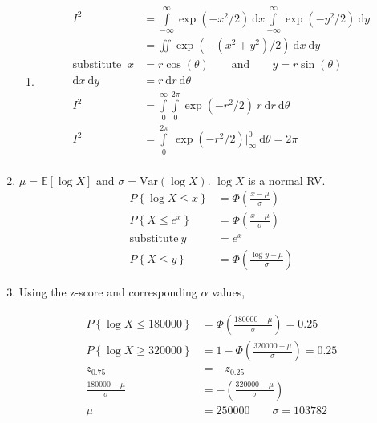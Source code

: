 \begin{enumerate}
\begin{enumerate}
			\item \begin{align}
				I^2 &= \int\limits_{-\infty}^{\infty} \exp(-x^2/2) \ \mathrm{d}x \int\limits_{-\infty}^{\infty} \exp(-y^2/2) \ \mathrm{d}y \nonumber \\
				&= \iint \exp(-(x^2+y^2)/2) \ \mathrm{d}x \ \mathrm{d}y \nonumber \\
				\text{substitute }\ x &= r\cos(\theta) \qquad \text{and} \qquad y = r\sin(\theta) \\
				\mathrm{d}x \ \mathrm{d}y &= r\ \mathrm{d}r\ \mathrm{d}\theta \nonumber \\
				I^2 &=  \int\limits_{0}^{\infty}  \int\limits_{0}^{2\pi} \exp(-r^2/2)\ r\ \mathrm{d}r\ \mathrm{d}\theta \nonumber \\
				I^2 &= \int\limits_{0}^{2\pi}\ \exp(-r^2/2)\Big|_{\infty}^0\ \mathrm{d}\theta = 2\pi \\
			\end{align}
		\end{enumerate}
	
	
	\item 
	
		$ \mu = \mathbb{E}[\log X]$ and $\sigma = \mathrm{Var}(\log X)$. $ \log X $ is a normal RV.
		\begin{align}
			P \left\{\log X \leq x\right\} &= \Phi\left(\frac{x - \mu}{\sigma}\right) \nonumber \\
			P \left\{X \leq e^x\right\} &= \Phi\left(\frac{x - \mu}{\sigma}\right) \nonumber \\
			\text{substitute}\ y &= e^x \\
			P \left\{X \leq y\right\} &= \Phi\left(\frac{\log y - \mu}{\sigma}\right)
		\end{align}
	
	
	\item Using the z-score and corresponding $ \alpha $ values,
	
		\begin{align}
			P \left\{\log X \leq 180000\right\} &= \Phi\left(\frac{180000 - \mu}{\sigma}\right) = 0.25 \nonumber \\
			P \left\{\log X \geq 320000\right\} &= 1 - \Phi\left(\frac{320000 - \mu}{\sigma}\right) = 0.25 \nonumber \\
			z_{0.75} &= - z_{0.25} \\
			\frac{180000 - \mu}{\sigma} &= - \left(\frac{320000 - \mu}{\sigma}\right) \\
			\mu &= 250000 \qquad \sigma = 103782 \nonumber \\
		\end{align}
		

\end{enumerate}
